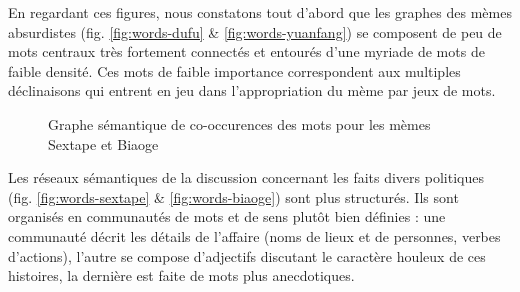 En regardant ces figures, nous constatons tout d{\textquoteright}abord que les graphes des mèmes absurdistes (fig. \ref{fig:words-dufu} \& \ref{fig:words-yuanfang}) se composent de peu de mots centraux très fortement connectés et entourés d{\textquoteright}une myriade de mots de faible densité. Ces mots de faible importance correspondent aux multiples déclinaisons qui entrent en jeu dans l'appropriation du mème par jeux de mots.

\begin{figure}[htbp]
    \centering
    
  \caption{
    Graphe sémantique de co-occurences des mots pour les mèmes Sextape et Biaoge
  }
\end{figure}

Les réseaux sémantiques de la discussion concernant les faits divers politiques (fig. \ref{fig:words-sextape} \& \ref{fig:words-biaoge}) sont plus structurés. Ils sont organisés en communautés de mots et de sens plut\^ot bien définies : une communauté décrit les détails de l{\textquoteright}affaire (noms de lieux et de personnes, verbes d{\textquoteright}actions), l{\textquoteright}autre se compose d{\textquoteright}adjectifs discutant le caractère houleux de ces histoires, la dernière est faite de mots plus anecdotiques.

